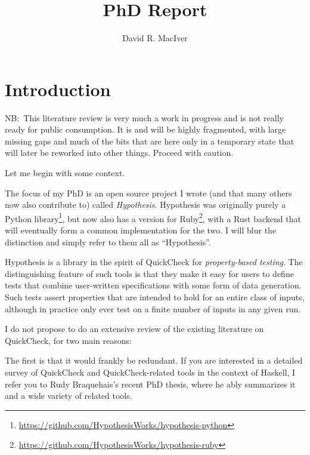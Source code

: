 

\title{PhD Report}
\author{David R. MacIver}



\maketitle

\tableofcontents

\chapter{Introduction}\label{chap:introduction}

NB:\ This literature review is very much a work in progress and is not really ready for public consumption.
It is and will be highly fragmented,
with large missing gaps and much of the bits that are here only in a temporary state that will later be reworked into other things.
Proceed with caution.

Let me begin with some context.

The focus of my PhD is an open source project I wrote (and that many others now also contribute to) called \emph{Hypothesis}.
Hypothesis was originally purely a Python library\footnote{\url{https://github.com/HypothesisWorks/hypothesis-python}},
but now also has a version for Ruby\footnote{\url{https://github.com/HypothesisWorks/hypothesis-ruby}},
with a Rust backend that will eventually form a common implementation for the two.
I will blur the distinction and simply refer to them all as ``Hypothesis''.

Hypothesis is a library in the spirit of QuickCheck\cite{DBLP:conf/icfp/ClaessenH00} for \emph{property-based testing}.
The distinguishing feature of such tools is that they make it easy for users to define tests that combine user-written specifications with some form of data generation.
Such tests assert properties that are intended to hold for an entire class of inputs,
although in practice only ever test on a finite number of inputs in any given run.

I do not propose to do an extensive review of the existing literature on QuickCheck,
for two main reasons:

The first is that it would frankly be redundant.
If you are interested in a detailed survey of QuickCheck and QuickCheck-related tools in the context of Haskell,
I refer you to Rudy Braquehais's recent PhD thesis\cite{matela2017tools},
where he ably summarizes it and a wide variety of related tools.


